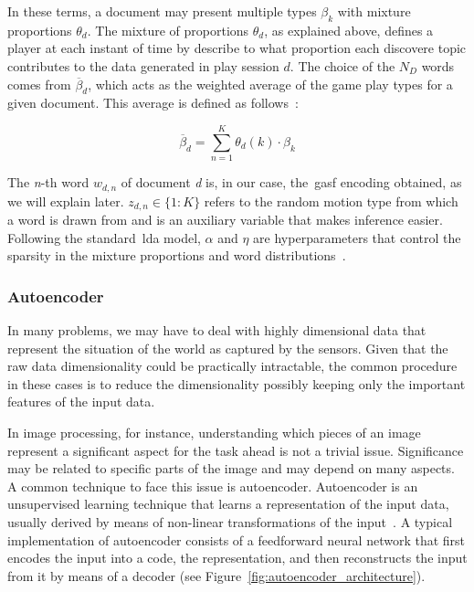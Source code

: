 In these terms, a document may present multiple types $\beta_{k}$ with mixture proportions $\theta_{d}$. The mixture of proportions $\theta_{d}$, as explained above, defines a player at each instant of time by describe to what proportion each discovere topic contributes to the data generated in play session $d$. The choice of the $N_{D}$ words comes from $\overline{\beta}_{d}$, which acts as the weighted average of the game play types for a given document. This average is defined as follows~\citep{blei_latent_2003,smith_mining_2016}:

\begin{equation}
\overline{\beta}_{d} = \sum_{n=1}^{K} \theta_{d}(k) \cdot \beta_{k}
\end{equation}

The \textit{n}-th word $w_{d,n}$ of document \textit{d} is, in our case, the~\gls{gasf} encoding obtained, as we will explain later. $z_{d,n} \in \{1:K\}$ refers to the random motion type from which a word is drawn from and is an auxiliary variable that makes inference easier. Following the standard~\gls{lda} model, $\alpha$ and $\eta$ are hyperparameters that control the sparsity in the mixture proportions and word distributions~\citep{smith_mining_2016}.

\subsubsection{Autoencoder}\label{sec:autoencoder}

In many problems, we may have to deal with highly dimensional data that represent the situation of the world as captured by the sensors. Given that the raw data dimensionality could be practically intractable, the common procedure in these cases is to reduce the dimensionality possibly keeping only the important features of the input data.

In image processing, for instance, understanding which pieces of an image represent a significant aspect for the task ahead is not a trivial issue. Significance may be related to specific parts of the image and may depend on many aspects. A common technique to face this issue is autoencoder.
Autoencoder is an unsupervised learning technique that learns a representation of the input data, usually derived by means of non-linear transformations of the input~\citep{goodfellow_deep_2016}. A typical implementation of autoencoder consists of a feedforward neural network that first encodes the input into a code, the representation, and then reconstructs the input from it by means of a decoder (see Figure~\ref{fig:autoencoder_architecture}).

